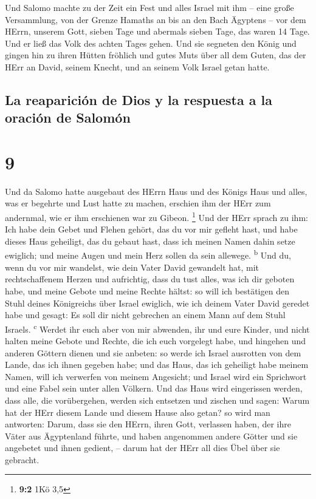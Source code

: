  Und Salomo machte zu der Zeit ein Fest und alles Israel
mit ihm -- eine große Versammlung, von der Grenze Hamaths an bis an den
Bach Ägyptens -- vor dem HErrn, unserem Gott, sieben Tage und abermals
sieben Tage, das waren 14 Tage.  Und er ließ das Volk des
achten Tages gehen. Und sie segneten den König und gingen hin zu ihren
Hütten fröhlich und gutes Muts über all dem Guten, das der HErr an
David, seinem Knecht, und an seinem Volk Israel getan hatte.

\hypertarget{la-reapariciuxf3n-de-dios-y-la-respuesta-a-la-oraciuxf3n-de-salomuxf3n}{%
\subsection{La reaparición de Dios y la respuesta a la oración de
Salomón}\label{la-reapariciuxf3n-de-dios-y-la-respuesta-a-la-oraciuxf3n-de-salomuxf3n}}

\hypertarget{section-8}{%
\section{9}\label{section-8}}

 Und da Salomo hatte ausgebaut des HErrn Haus und des
Königs Haus und alles, was er begehrte und Lust hatte zu machen,
 erschien ihm der HErr zum andernmal, wie er ihm
erschienen war zu Gibeon. \footnote{\textbf{9:2} 1Kö 3,5} 
Und der HErr sprach zu ihm: Ich habe dein Gebet und Flehen gehört, das
du vor mir gefleht hast, und habe dieses Haus geheiligt, das du gebaut
hast, dass ich meinen Namen dahin setze ewiglich; und meine Augen und
mein Herz sollen da sein allewege. \textsuperscript{b} 
Und du, wenn du vor mir wandelst, wie dein Vater David gewandelt hat,
mit rechtschaffenem Herzen und aufrichtig, dass du tust alles, was ich
dir geboten habe, und meine Gebote und meine Rechte hältst:
 so will ich bestätigen den Stuhl deines Königreichs über
Israel ewiglich, wie ich deinem Vater David geredet habe und gesagt: Es
soll dir nicht gebrechen an einem Mann auf dem Stuhl Israels.
\textsuperscript{c}  Werdet ihr euch aber von mir
abwenden, ihr und eure Kinder, und nicht halten meine Gebote und Rechte,
die ich euch vorgelegt habe, und hingehen und anderen Göttern dienen und
sie anbeten:  so werde ich Israel ausrotten von dem Lande,
das ich ihnen gegeben habe; und das Haus, das ich geheiligt habe meinem
Namen, will ich verwerfen von meinem Angesicht; und Israel wird ein
Sprichwort und eine Fabel sein unter allen Völkern.  Und
das Haus wird eingerissen werden, dass alle, die vorübergehen, werden
sich entsetzen und zischen und sagen: Warum hat der HErr diesem Lande
und diesem Hause also getan?  so wird man antworten:
Darum, dass sie den HErrn, ihren Gott, verlassen haben, der ihre Väter
aus Ägyptenland führte, und haben angenommen andere Götter und sie
angebetet und ihnen gedient, -- darum hat der HErr all dies Übel über
sie gebracht.

